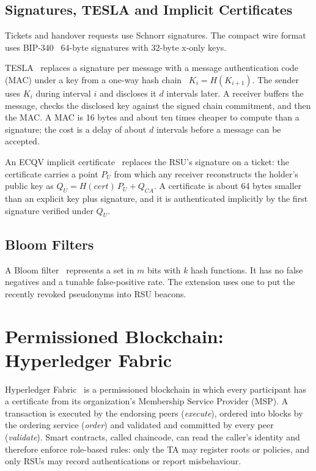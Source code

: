 \subsection{Signatures, TESLA and Implicit Certificates}\label{sec:tesla-ecqv}

Tickets and handover requests use Schnorr signatures. The compact wire format uses
BIP-340~\cite{bip340} 64-byte signatures with 32-byte x-only keys.

TESLA~\cite{perrig2000tesla} replaces a signature per message with a message authentication code
(MAC) under a key from a one-way hash chain~\cite{lamport1981password} $K_i = H(K_{i+1})$. The sender uses $K_i$ during
interval $i$ and discloses it $d$ intervals later. A receiver buffers the message, checks the
disclosed key against the signed chain commitment, and then the MAC. A MAC is 16 bytes and about ten
times cheaper to compute than a signature; the cost is a delay of about $d$ intervals before a message
can be accepted.

An ECQV implicit certificate~\cite{sec4ecqv} replaces the RSU's signature on a ticket: the
certificate carries a point $P_U$ from which any receiver reconstructs the holder's public key as
$Q_U = H(\mathit{cert})\,P_U + Q_{CA}$. A certificate is about 64 bytes smaller than an explicit
key plus signature, and it is authenticated implicitly by the first signature verified under $Q_U$.

\subsection{Bloom Filters}

A Bloom filter~\cite{bloom1970} represents a set in $m$ bits with $k$ hash functions. It has no false
negatives and a tunable false-positive rate. The extension uses one to put the recently revoked
pseudonyms into RSU beacons.

\section{Permissioned Blockchain: Hyperledger Fabric}\label{sec:bg-fabric}

Hyperledger Fabric~\cite{androulaki2018fabric} is a permissioned blockchain in which every
participant has a certificate from its organization's Membership Service Provider (MSP). A
transaction is executed by the endorsing peers (\emph{execute}), ordered into blocks by the ordering
service (\emph{order}) and validated and committed by every peer (\emph{validate}). Smart contracts,
called chaincode, can read the caller's identity and therefore enforce role-based rules: only the TA
may register roots or policies, and only RSUs may record authentications or report misbehaviour.

